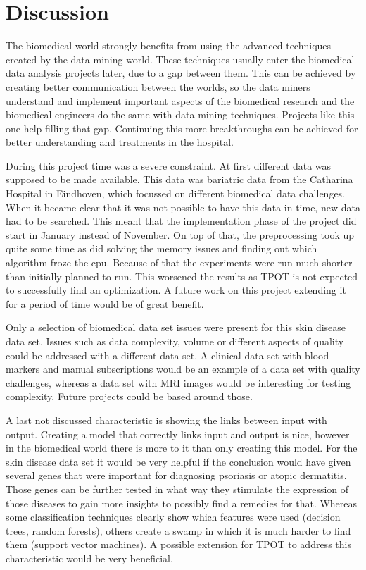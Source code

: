 \documentclass[10pt,a4paper]{article}
\begin{document}
	\section{Discussion}
	\label{sec:Discussion}
	
	The biomedical world strongly benefits from using the advanced techniques created by the data mining world. These techniques usually enter the biomedical data analysis projects later, due to a gap between them. This can be achieved by creating better communication between the worlds, so the data miners understand and implement important aspects of the biomedical research and the biomedical engineers do the same with data mining techniques. Projects like this one help filling that gap. Continuing this more breakthroughs can be achieved for better understanding and treatments in the hospital.
	
	During this project time was a severe constraint. At first different data was supposed to be made available. This data was bariatric data from the Catharina Hospital in Eindhoven, which focussed on different biomedical data challenges.\cite{Deneer2017Thesis} When it became clear that it was not possible to have this data in time, new data had to be searched. This meant that the implementation phase of the project did start in January instead of November. On top of that, the preprocessing took up quite some time as did solving the memory issues and finding out which algorithm froze the cpu. Because of that the experiments were run much shorter than initially planned to run. This worsened the results as TPOT is not expected to successfully find an optimization. A future work on this project extending it for a period of time would be of great benefit.
	
	Only a selection of biomedical data set issues were present for this skin disease data set. Issues such as data complexity, volume or different aspects of quality could be addressed with a different data set. A clinical data set with blood markers and manual subscriptions would be an example of a data set with quality challenges, whereas a data set with MRI images would be interesting for testing complexity. Future projects could be based around those.
	
	A last not discussed characteristic is showing the links between input with output. Creating a model that correctly links input and output is nice, however in the biomedical world there is more to it than only creating this model. For the skin disease data set it would be very helpful if the conclusion would have given several genes that were important for diagnosing psoriasis or atopic dermatitis. Those genes can be further tested in what way they stimulate the expression of those diseases to gain more insights to possibly find a remedies for that. Whereas some classification techniques clearly show which features were used (decision trees, random forests), others create a swamp in which it is much harder to find them (support vector machines). A possible extension for TPOT to address this characteristic would be very beneficial.
	
	 
	
	
\end{document}
